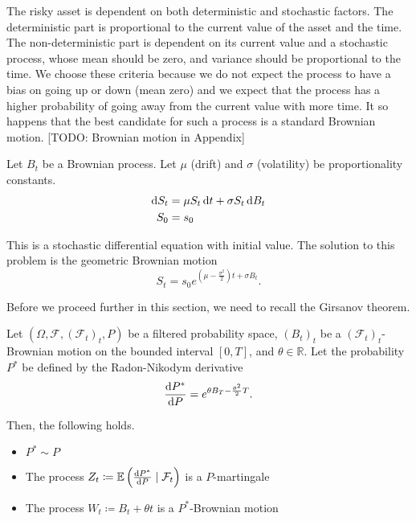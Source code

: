 The risky asset is dependent on both deterministic and stochastic factors. The deterministic part is proportional to the current value of the asset and the time. The non-deterministic part is dependent on its current value and a stochastic process, whose mean should be zero, and variance should be proportional to the time. We choose these criteria because we do not expect the process to have a bias on going up or down (mean zero) and we expect that the process has a higher probability of going away from the current value with more time. It so happens that the best candidate for such a process is a standard Brownian motion.
[TODO: Brownian motion in Appendix]

Let $ B_t $ be a Brownian process. Let $ \mu $ (drift) and $ \sigma $ (volatility) be proportionality constants.
\begin{subequations}
	\label{eq:continous-risky-sde}
	\begin{align}
		\dif S_t  &=  \mu S_t \dif t + \sigma S_t \dif B_t \\
		S_0  &=  s_0
	\end{align}
\end{subequations}

This is a stochastic differential equation with initial value. The solution to this problem is the geometric Brownian motion
\begin{equation}
\label{eq:continous-risky-int}
S_t = s_0 e^{ ( \mu - \frac{\sigma^2}{2} )t + \sigma B_t }.
\end{equation}


Before we proceed further in this section, we need to recall the Girsanov theorem.
\begin{thm}[Girsanov]
	\label{thm:continuous-girsanov}
	Let $ (\Omega, \mathcal{F}, (\mathcal{F}_t)_t, P) $ be a filtered probability space, $ (B_t)_t $ be a $ (\mathcal{F}_t)_t $-Brownian motion on the bounded interval $ [0, T] $, and $ \theta \in \mathbb{R} $. Let the probability $ P^* $ be defined by the Radon-Nikodym derivative
	\begin{equation}
	\frac{\dif P^*}{\dif P} = e^{ \theta B_T - \frac{\theta^2}{2} T }.
	\end{equation}
	
	Then, the following holds.
	\begin{itemize}
		\item $ P^* \sim P $
		\item The process $ Z_t \coloneqq \E \left( \frac{\dif P^*}{\dif P} \mid \mathcal{F}_t \right) $ is a $ P $-martingale
		\item The process $ W_t \coloneqq B_t + \theta t $ is a $ P^* $-Brownian motion
	\end{itemize}
\end{thm}

